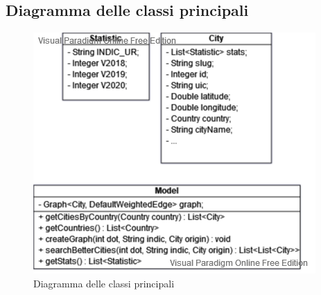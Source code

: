 \documentclass[12pt, a4paper]{article}
\begin{document}
	\subsection{Diagramma delle classi principali}
	\begin{figure}[h]
		\centering
		\includegraphics[width=0.7\linewidth]{diagrammaClassiPrincipali}
		\caption{Diagramma delle classi principali}
		\label{diagClassi}
	\end{figure}
	
	\newpage
\end{document}
